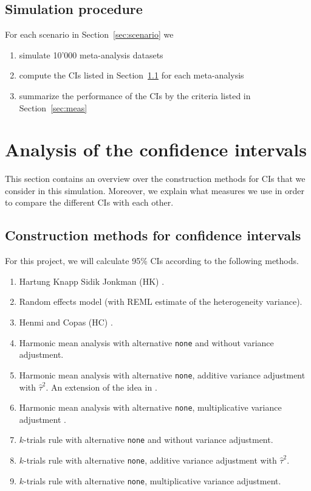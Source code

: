 \documentclass[letterpaper, 12pt]{article}
\begin{document}
\subsection{Simulation procedure}
For each scenario in Section~\ref{sec:scenario} we
\begin{enumerate}
\item simulate 10'000 meta-analysis datasets
\item compute the CIs listed in Section~\ref{sec:method} for each meta-analysis
\item summarize the performance of the CIs by the criteria listed in Section~\ref{sec:meas}
\end{enumerate}

\section{Analysis of the confidence intervals}

This section contains an overview over the construction methods for CIs that we consider in this simulation. Moreover, we explain what measures we use in order to compare the different CIs with each other.

\subsection{Construction methods for confidence intervals} \label{sec:method}

For this project, we will calculate 95\% CIs according to the following methods.

\begin{enumerate}
\item Hartung Knapp Sidik Jonkman (HK) \citep{IntHoutIoannidis}. %
\item Random effects model (with REML estimate of the heterogeneity variance). %
\item Henmi and Copas (HC) \citep{henm:copa:10}. %
\item Harmonic mean analysis with alternative \texttt{none} \citep{Held2020b} and without variance adjustment. %
\item Harmonic mean analysis with alternative \texttt{none}, additive variance adjustment with $\hat \tau^2$. An extension of the idea in \citet{Held2020b}. 
\item Harmonic mean analysis with alternative \texttt{none}, multiplicative variance adjustment \citep{mawd:etal:17}.
\item $k$-trials rule with alternative \texttt{none} and without variance adjustment.
\item $k$-trials rule with alternative \texttt{none}, additive variance adjustment with $\hat \tau^2$. 
\item $k$-trials rule with alternative \texttt{none}, multiplicative variance adjustment.
\end{enumerate}
\end{document}
